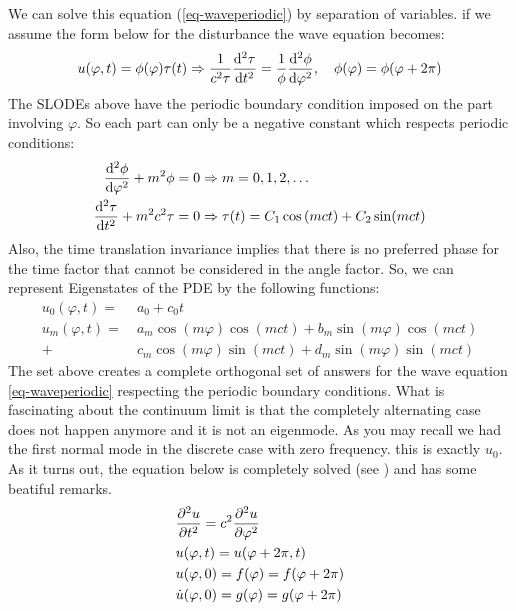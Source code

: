 \documentclass[final,5p,times,twocolumn,authoryear]{elsarticle}
\begin{document}
We can solve this equation (\ref{eq-waveperiodic}) by separation of variables. if we assume the form below for the disturbance the wave equation becomes:
\[ u(\varphi,t) = \phi(\varphi)\tau(t) \Rightarrow \frac{1}{c^2\tau}\odv[order={2}]{\tau}{t} = \frac{1}{\phi}\odv[order={2}]{\phi}{\varphi}, \quad \phi(\varphi) = \phi(\varphi+2\pi) \]
The SLODEs above have the periodic boundary condition imposed on the part involving $\varphi$. So each part can only be a negative constant which respects periodic conditions:
\begin{align}
	\odv[order={2}]{\phi}{\varphi} + m^2 \phi =0 &\Rightarrow m = 0 , 1 , 2 , \dots \label{eq-restrictions} \\
	\odv[order={2}]{\tau}{t} + m^2c^2 \tau =0 &\Rightarrow \tau(t) = C_1 \cos\left(mct\right) + C_2 \sin(mct) \label{eq-timepart}
\end{align}
Also, the time translation invariance implies that there is no preferred phase for the time factor that cannot be considered in the angle factor. So, we can represent Eigenstates of the PDE by the following functions:
\begin{equation}\label{eq-answers}
	\begin{aligned}
		u_0(\varphi,t) =& ~ a_0 + c_0 t \\
		u_m(\varphi,t) =& ~ a_m \cos(m\varphi)\cos(mct) + b_m \sin(m\varphi)\cos(mct) \\
		+& ~ c_m \cos(m\varphi)\sin(mct) + d_m \sin(m\varphi)\sin(mct)
	\end{aligned}
\end{equation}
The set above creates a complete orthogonal set of answers for the wave equation \ref{eq-waveperiodic} respecting the periodic boundary conditions. What is fascinating about the continuum limit is that the completely alternating case does not happen anymore and it is not an eigenmode. As you may recall we had the first normal mode in the discrete case with zero frequency. this is exactly $u_0$. As it turns out, the equation below is completely solved (see \cite{evansPartialDifferentialEquations2022}) and has some beatiful remarks.
\begin{equation}
	\label{eq-fullwave}\begin{aligned}
		& \pdv[order={2}]{u}{t} = c^2 \pdv[order={2}]{u}{\varphi} \\
		& u(\varphi,t) = u(\varphi+2\pi,t) \\
		& u(\varphi,0) = f(\varphi) = f(\varphi + 2\pi) \\
		& \dot{u}(\varphi,0) =g(\varphi) =  g(\varphi + 2\pi)
	\end{aligned}
\end{equation}
\end{document}
